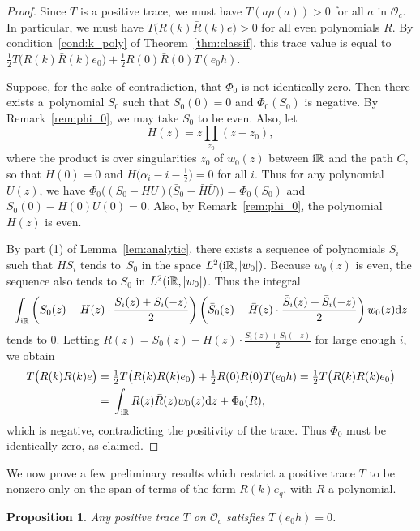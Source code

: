 \documentclass[pdftex]{sigma}
\newcommand\RR{\mathbb{R}}
\newcommand\cO{\mathcal{O}}
\renewcommand\d{\mathrm{d}}
\newcommand\R{\bar{R}}
\renewcommand\S{\bar{S}}
\newcommand\half{\ensuremath{\frac{1}{2}}}
\newcommand\thalf{\ensuremath{\tfrac12}}
\numberwithin{equation}{section}
\newtheorem{Proposition}[Theorem]{Proposition}
\theoremstyle{definition}
\begin{document}
\begin{proof}
 Since $T$ is a positive trace,
 we must have $T(a \rho(a)) > 0$ for all $a$ in $\cO_c$.
 In particular, we must have $T\big(R(k) \R(k) e\big) > 0$
 for all even polynomials $R$.
 By condition~\ref{cond:k_poly} of Theorem~\ref{thm:classif},
 this trace value is equal to
 $\half T\big(R(k) \R(k) e_0\big) + \half R(0) \R(0) T(e_0 h)$.

 Suppose, for the sake of contradiction,
 that $\Phi_0$ is not identically zero.
 Then there exists a~polynomial $S_0$
 such that $S_0(0) = 0$ and $\Phi_0(S_0)$ is negative.
 By Remark~\ref{rem:phi_0}, we may take $S_0$ to be even.
 Also, let
 \[
 H(z) = z \prod_{z_0} (z - z_0),
 \]
 where the product is over singularities $z_0$ of $w_0(z)$ between ${\rm i}\RR$ and the path $C$,
 so that $H(0) = 0$ and $H\bigl(\alpha_i - i - \half\bigr) = 0$
 for all $i$.
 Thus for any polynomial $U(z)$, we have
 $\Phi_0 \bigl( (S_0 - HU)\bigl(\S_0 - \bar{H} \bar{U}\bigr) \bigr) = \Phi_0(S_0)$
 and $S_0(0) - H(0) U(0) = 0$.
 Also, by Remark~\ref{rem:phi_0}, the polynomial $H(z)$ is even.

 By part (1) of Lemma~\ref{lem:analytic},
 there exists a sequence of polynomials $S_i$
 such that $HS_i$ tends to~$S_0$ in the space $L^2({\rm i}\RR, |w_0|)$.
 Because $w_0(z)$ is even,
 the sequence 
 also tends to $S_0$ in $L^2({\rm i}\RR, |w_0|)$.
 Thus the integral
 \[
 \int_{{\rm i}\RR} \left( S_0(z) - H(z) \cdot
 \frac{S_i(z) + S_i(-z)}{2} \right)
 \left( \S_0(z) - \bar{H}(z) \cdot
 \frac{\S_i(z) + \S_i(-z)}{2} \right)
 w_0(z) \d z
 \]
 tends to $0$.
 Letting $R(z) = S_0(z) - H(z) \cdot \frac{S_i(z) + S_i(-z)}{2}$
 for large enough $i$,
 we obtain
 \begin{align*}
 T\bigl(R(k) \R(k) e\bigr)
 ={}& \thalf T\bigl(R(k) \R(k) e_0\bigr) + \thalf R(0) \R(0) T(e_0 h) = \thalf T\bigl(R(k) \R(k) e_0\bigr) \\
 ={}& \int_{{\rm i}\RR} R(z) \R(z) w_0(z) \d z + \Phi_0 (R),
 \end{align*}
 which is negative, contradicting the positivity of the trace.
 Thus $\Phi_0$ must be identically zero, as claimed.
\end{proof}


We now prove a few preliminary results
which restrict a positive trace $T$
to be nonzero only on the span of terms of the form
$R(k) e_q$, with $R$ a polynomial.

\begin{Proposition}
 \label{prop:pos_e_0}
 Any positive trace $T$ on $\cO_c$ satisfies $T(e_0 h) = 0$.
\end{Proposition}
\end{document}
